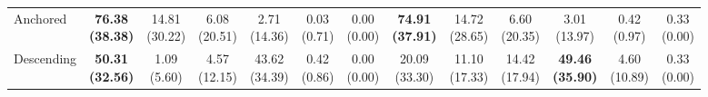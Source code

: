 {\begin{tabular}{l|cccccc|cccccc}
Anchored & \bfseries \makecell{76.38 \\ (38.38)} & \makecell{14.81 \\ (30.22)} & \makecell{6.08 \\ (20.51)} & {\cellcolor[HTML]{C8E6C9}} \makecell{2.71 \\ (14.36)} & \makecell{0.03 \\ (0.71)} & \makecell{0.00 \\ (0.00)} & \bfseries \makecell{74.91 \\ (37.91)} & \makecell{14.72 \\ (28.65)} & \makecell{6.60 \\ (20.35)} & {\cellcolor[HTML]{C8E6C9}} \makecell{3.01 \\ (13.97)} & \makecell{0.42 \\ (0.97)} & \makecell{0.33 \\ (0.00)} \\
Descending & \bfseries \makecell{50.31 \\ (32.56)} & \makecell{1.09 \\ (5.60)} & \makecell{4.57 \\ (12.15)} & {\cellcolor[HTML]{C8E6C9}} \makecell{43.62 \\ (34.39)} & \makecell{0.42 \\ (0.86)} & \makecell{0.00 \\ (0.00)} & \makecell{20.09 \\ (33.30)} & \makecell{11.10 \\ (17.33)} & \makecell{14.42 \\ (17.94)} & {\cellcolor[HTML]{C8E6C9}} \bfseries \makecell{49.46 \\ (35.90)} & \makecell{4.60 \\ (10.89)} & \makecell{0.33 \\ (0.00)} \\
\bottomrule
\end{tabular}
}%

